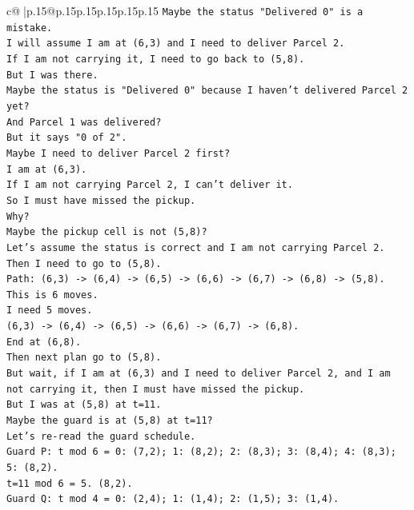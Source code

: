 \documentclass{article}
\begin{document}
{\begin{supertabular}{c@{$\;$}|p{.15\linewidth}@{}p{.15\linewidth}p{.15\linewidth}p{.15\linewidth}p{.15\linewidth}p{.15\linewidth}}
{{{\texttt{Maybe the status "Delivered 0" is a mistake.} \\
\texttt{I will assume I am at (6,3) and I need to deliver Parcel 2.} \\
\texttt{If I am not carrying it, I need to go back to (5,8).} \\
\texttt{But I was there.} \\
\texttt{Maybe the status is "Delivered 0" because I haven't delivered Parcel 2 yet?} \\
\texttt{And Parcel 1 was delivered?} \\
\texttt{But it says "0 of 2".} \\
\texttt{Maybe I need to deliver Parcel 2 first?} \\
\texttt{I am at (6,3).} \\
\texttt{If I am not carrying Parcel 2, I can't deliver it.} \\
\texttt{So I must have missed the pickup.} \\
\texttt{Why?} \\
\texttt{Maybe the pickup cell is not (5,8)?} \\
\texttt{Let's assume the status is correct and I am not carrying Parcel 2.} \\
\texttt{Then I need to go to (5,8).} \\
\texttt{Path: (6,3) {-}> (6,4) {-}> (6,5) {-}> (6,6) {-}> (6,7) {-}> (6,8) {-}> (5,8).} \\
\texttt{This is 6 moves.} \\
\texttt{I need 5 moves.} \\
\texttt{(6,3) {-}> (6,4) {-}> (6,5) {-}> (6,6) {-}> (6,7) {-}> (6,8).} \\
\texttt{End at (6,8).} \\
\texttt{Then next plan go to (5,8).} \\
\texttt{But wait, if I am at (6,3) and I need to deliver Parcel 2, and I am not carrying it, then I must have missed the pickup.} \\
\texttt{But I was at (5,8) at t=11.} \\
\texttt{Maybe the guard is at (5,8) at t=11?} \\
\texttt{Let's re{-}read the guard schedule.} \\
\texttt{Guard P: t mod 6 = 0: (7,2); 1: (8,2); 2: (8,3); 3: (8,4); 4: (8,3); 5: (8,2).} \\
\texttt{t=11 mod 6 = 5. (8,2).} \\
\texttt{Guard Q: t mod 4 = 0: (2,4); 1: (1,4); 2: (1,5); 3: (1,4).} \\
}}}
\end{supertabular}}
\end{document}
